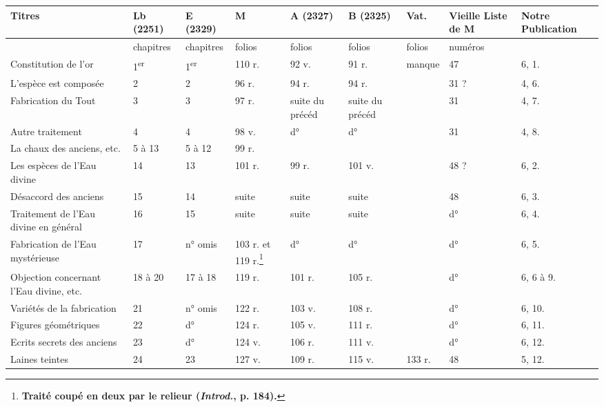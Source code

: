 \documentclass[a4paper, 11pt, oneside, polutonikogreek, french]{article}
\begin{document}
\begin{center}
    \scriptsize
    \begin{longtable}{|p{20mm}|p{11mm}|p{11mm}|p{11mm}|p{11mm}|p{11mm}|p{11mm}|p{11mm}|p{15mm}|}
\hline
        \textbf{Titres} & \textbf{Lb (2251)} & \textbf{E (2329)} & \textbf{M} & \textbf{A (2327)} & \textbf{B (2325)} & \textbf{Vat.} & \textbf{Vieille Liste de M} & \textbf{Notre Publication} \\ \hline
        ~ & chapitres & chapitres & folios & folios & folios & folios & numéros & ~ \\ \hline
        Constitution de l'or & 1\textsuperscript{er} & 1\textsuperscript{er} & 110 r. & 92 v. & 91 r. & manque & 47 & 6, 1. \\ \hline
        L'espèce est composée & 2 & 2 & 96 r. & 94 r. & 94 r. & ~ & 31 ? & 4, 6. \\ \hline
        Fabrication du Tout & 3 & 3 & 97 r. & suite du précéd & suite du précéd & ~ & 31 & 4, 7. \\ \hline
        Autre traitement & 4 & 4 & 98 v. & d° & d° & ~ & 31 & 4, 8. \\ \hline
        La chaux des anciens, etc. & 5 à 13 & 5 à 12 & 99 r. & ~ & ~ & ~ & ~ & ~ \\ \hline
        Les espèces de l'Eau divine & 14 & 13 & 101 r. & 99 r. & 101 v. & ~ & 48 ? & 6, 2. \\ \hline
        Désaccord des anciens & 15 & 14 & suite & suite & suite & ~ & 48 & 6, 3. \\ \hline
        Traitement de l'Eau divine en général & 16 & 15 & suite & suite & suite & ~ & d° & 6, 4. \\ \hline
        Fabrication de l'Eau mystérieuse & 17 & n° omis & 103 r. et 119 r.\footnote{\bfseries Traité coupé en deux par le relieur (\emph{Introd.}, p. 184).} & d° & d° & ~ & d° & 6, 5. \\ \hline
        Objection concernant l'Eau divine, etc. & 18 à 20 & 17 à 18 & 119 r. & 101 r. & 105 r. & ~ & d° & 6, 6 à 9. \\ \hline
        Variétés de la fabrication & 21 & n° omis & 122 r. & 103 v. & 108 r. & ~ & d° & 6, 10. \\ \hline
        Figures géométriques & 22 & d° & 124 r. & 105 v. & 111 r. & ~ & d° & 6, 11. \\ \hline
        Ecrits secrets des anciens & 23 & d° & 124 v. & 106 r. & 111 v. & ~ & d° & 6, 12. \\ \hline
        Laines teintes & 24 & 23 & 127 v. & 109 r. & 115 v. & 133 r. & 48 & 5, 12. \\ \hline

\end{longtable}
\end{center}
\end{document}
